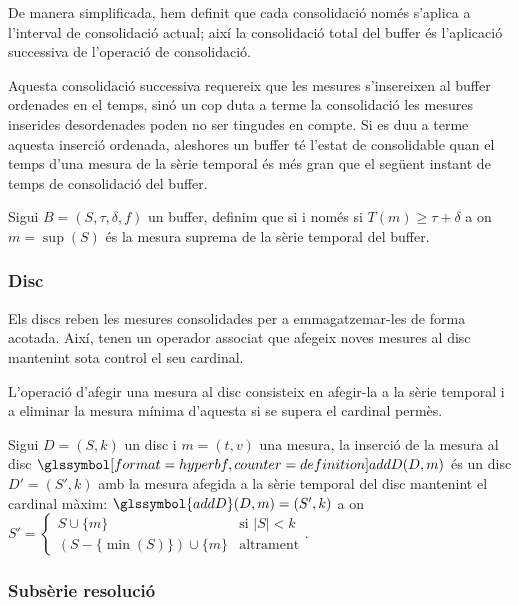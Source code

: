 De manera simplificada, hem definit que cada consolidació només
s'aplica a l'interval de consolidació actual; així la consolidació
total del buffer és l'aplicació successiva de l'operació de
consolidació.

Aquesta consolidació successiva requereix que les mesures s'insereixen
al buffer ordenades en el temps, sinó un cop duta a terme la
consolidació les mesures inserides desordenades poden no ser tingudes
en compte. Si es duu a terme aquesta inserció ordenada, aleshores un
buffer té l'estat de consolidable quan el temps d'una mesura de la
sèrie temporal és més gran que el següent instant de temps de
consolidació del buffer.
\begin{definition}\label{def:model:buffer_consolidable}
  Sigui $B=(S,\tau,\delta,f)$ un buffer, definim que
   si i només si $T(m) \geq \tau+\delta$ a on
  $m=\sup(S)$ és la mesura suprema de la sèrie temporal del buffer.
\end{definition}



\subsubsection{Disc}

Els discs reben les mesures consolidades per a emmagatzemar-les de
forma acotada. Així, tenen un operador associat que afegeix noves
mesures al disc mantenint sota control el seu cardinal.


L'operació d'afegir una mesura al disc consisteix en afegir-la a la
sèrie temporal i a eliminar la mesura mínima d'aquesta si se supera el
cardinal permès.
\begin{definition}
  Sigui $D=(S,k)$ un disc i $m=(t,v)$ una mesura, la inserció de la
  mesura al disc $\glssymboldef{addD}(D,m)$ és un disc $D'=(S',k)$
  amb la mesura afegida a la sèrie temporal del disc mantenint el
  cardinal màxim: $\glssymbol{addD}(D,m) = (S',k)$ a on $S'=
  \begin{cases}
      S\cup\{m\} &\text{si }  |S|<k\\
      (S-\{\min(S)\}) \cup \{m\} &\text{altrament}
    \end{cases}$.
\end{definition}




\subsubsection{Subsèrie resolució}

